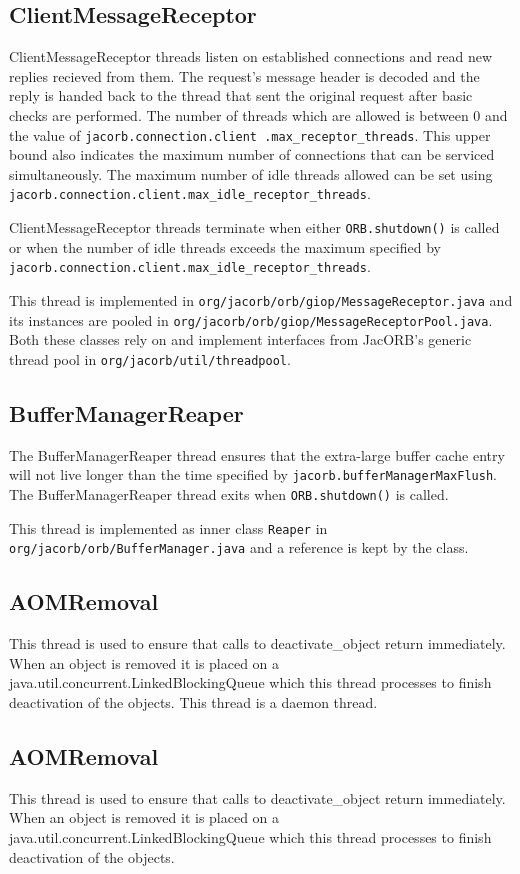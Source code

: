 \subsection*{ClientMessageReceptor}
ClientMessageReceptor threads listen on established connections and read new
replies recieved from them. The request's message header is decoded and the
reply is handed back to the thread that sent the original request after basic
checks are performed. The number of threads which are allowed is between 0 and
the value of {\tt jacorb.connection.client .max\_receptor\_threads}. This upper
bound also indicates the maximum number of connections that can be serviced
simultaneously. The maximum number of idle threads allowed can be set using
{\tt jacorb.connection.client.max\_idle\_receptor\_threads}.

ClientMessageReceptor threads terminate when either {\tt ORB.shutdown()}
is called or when the number of idle threads exceeds the maximum specified by
{\tt jacorb.connection.client.max\_idle\_receptor\_threads}.

This thread is implemented in {\tt org/jacorb/orb/giop/MessageReceptor.java}
and its instances are pooled in
{\tt org/jacorb/orb/giop/MessageReceptorPool.java}. Both these classes rely on
and implement interfaces from JacORB's generic thread pool in
{\tt org/jacorb/util/threadpool}.

\subsection*{BufferManagerReaper}
The BufferManagerReaper thread ensures that the extra-large buffer cache entry
will not live longer than the time specified by
{\tt jacorb.bufferManagerMaxFlush}. The BufferManagerReaper thread exits when
{\tt ORB.shutdown()} is called.

This thread is implemented as inner class {\tt Reaper} in {\tt
org/jacorb/orb/BufferManager.java} and a reference is kept by the class.

\subsection*{AOMRemoval}
This thread is used to ensure that calls to deactivate\_object return
immediately. When an object is removed it is placed on a java.util.concurrent.LinkedBlockingQueue
which this thread processes to finish deactivation of the objects. This thread is a daemon thread.

\subsection*{AOMRemoval}
This thread is used to ensure that calls to deactivate\_object return
immediately. When an object is removed it is placed on a java.util.concurrent.LinkedBlockingQueue
which this thread processes to finish deactivation of the objects.

